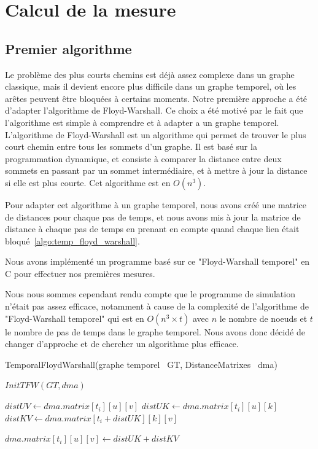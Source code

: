 \section{Calcul de la mesure}\label{sec:calcul_mesure}

\subsection{Premier algorithme}

Le problème des plus courts chemins est déjà assez complexe dans un graphe classique, mais il devient encore plus difficile dans un graphe temporel,
où les arêtes peuvent être bloquées à certains moments.
Notre première approche a été d'adapter l'algorithme de Floyd-Warshall\cite{floyd_warshall_ref}. 
Ce choix a été motivé par le fait que l'algorithme est simple à comprendre et à adapter a un graphe temporel. 
L'algorithme de Floyd-Warshall est un algorithme qui permet de trouver le plus court chemin entre 
tous les sommets d'un graphe. Il est basé sur la programmation dynamique, et consiste à 
comparer la distance entre deux sommets en passant par un sommet intermédiaire, 
et à mettre à jour la distance si elle est plus courte. Cet algorithme est en $O(n^3)$. 

Pour adapter cet algorithme à un graphe temporel, nous avons créé une matrice de distances pour 
chaque pas de temps, et nous avons mis à jour la matrice de distance à chaque pas de temps 
en prenant en compte quand chaque lien était bloqué~\ref{algo:temp_floyd_warshall}.

Nous avons implémenté un programme basé sur ce "Floyd-Warshall temporel" en C pour effectuer nos premières mesures. 

Nous nous sommes cependant rendu compte que le programme de simulation n'était 
pas assez efficace, notamment à cause de la complexité de l'algorithme de "Floyd-Warshall temporel" qui est 
en $O(n^3 \times t)$
avec $n$ le nombre de noeuds et $t$ le nombre de pas de temps dans le graphe temporel.
Nous avons donc décidé de changer d'approche et de chercher un algorithme plus efficace.

\begin{algorithm}[H]
    TemporalFloydWarshall(graphe temporel \ GT, DistanceMatrixes \ dma)
\begin{algorithmic}
	\State $InitTFW(GT, dma)$

				
					\State $distUV \gets dma.matrix[t_{i}][u][v]$
					\State $distUK \gets dma.matrix[t_{i}][u][k]$
					\State $distKV \gets dma.matrix[t_{i}+distUK][k][v]$

						\State $dma.matrix[t_{i}][u][v] \gets distUK + distKV$
					\EndIf
				\EndFor
			\EndFor
		\EndFor
	\EndFor 
\end{algorithmic}
\end{algorithm}\label{algo:temp_floyd_warshall}

